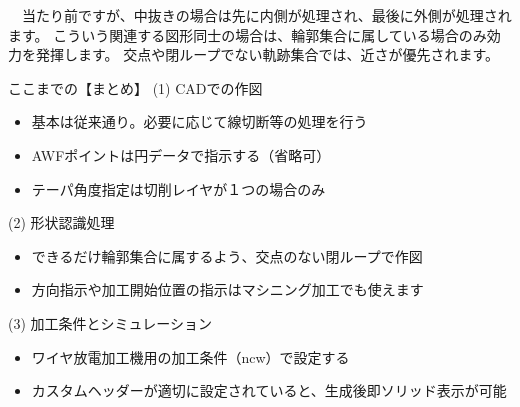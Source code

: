 　当たり前ですが、中抜きの場合は先に内側が処理され、最後に外側が処理されます。
こういう関連する図形同士の場合は、輪郭集合に属している場合のみ効力を発揮します。
交点や閉ループでない軌跡集合では、近さが優先されます。

\vspace*{3zh}
\begin{itembox}[l]{ここまでの【まとめ】}
(1) CADでの作図
\begin{itemize}
\item 基本は従来通り。必要に応じて線切断等の処理を行う
\item AWFポイントは円データで指示する（省略可）
\item テーパ角度指定は切削レイヤが１つの場合のみ
\end{itemize}
(2) 形状認識処理
\begin{itemize}
\item できるだけ輪郭集合に属するよう、交点のない閉ループで作図
\item 方向指示や加工開始位置の指示はマシニング加工でも使えます
\end{itemize}
(3) 加工条件とシミュレーション
\begin{itemize}
\item ワイヤ放電加工機用の加工条件（ncw）で設定する
\item カスタムヘッダーが適切に設定されていると、生成後即ソリッド表示が可能
\end{itemize}
\end{itembox}
